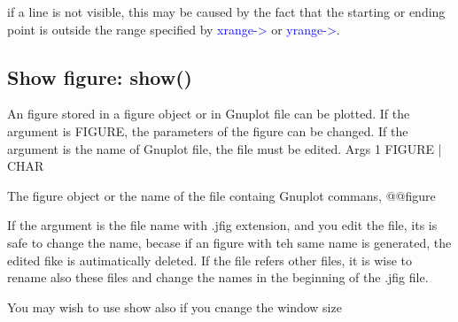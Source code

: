 \begin{note}
if a line is not visible, this may be caused by the fact that
the starting or ending point is outside the range specified by \textcolor{blue}{xrange->} or \textcolor{blue}{yrange->}.
\end{note}
\subsection{Show figure: \textcolor{VioletRed}{show}()}
\label{show}
An figure stored in a figure object or in Gnuplot file can be plotted. If the
argument is FIGURE, the
parameters of the figure can be changed. If the argument is the name of
Gnuplot file, the file must be edited.
\vspace{0.3cm}
\hline
\vspace{0.3cm}
\noindent Args  \tabto{3cm}  1 \tabto{5cm}   FIGURE | CHAR  \tabto{7cm}
\begin{changemargin}{3cm}{0cm}
\noindent  The figure object or the name of the file containg Gnuplot commans,
@@figure
\end {changemargin}
\hline
\vspace{0.2cm}
\begin{note}
If the argument is the file name with .jfig extension, and you edit the file, its is safe to change the name,
becase if an figure with teh same name is generated, the edited fike is autimatically
deleted. If the file refers other files, it is wise to rename also these files and change
the names in the beginning of the .jfig file.
\end{note}
\begin{note}
You may wish to use show also if you cnange the window size
\end{note}
